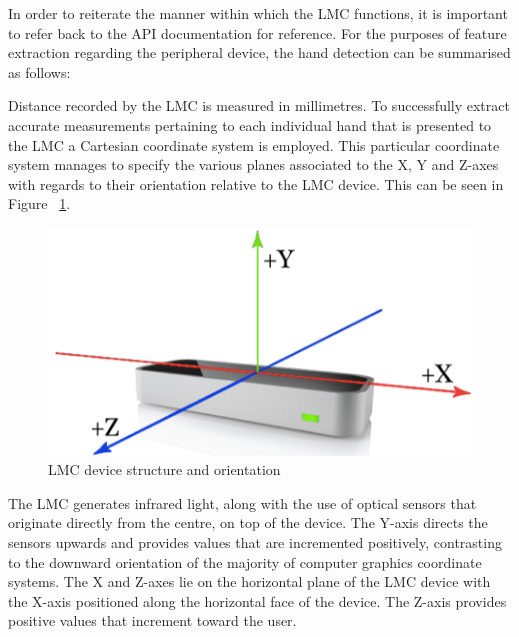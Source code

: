In order to reiterate the manner within which the LMC functions, it is important to refer back to the API documentation for reference. For the purposes of feature extraction regarding the peripheral device, the hand detection can be summarised as follows:

Distance recorded by the LMC is measured in millimetres. 
To successfully extract accurate measurements pertaining to each individual hand that is presented to the LMC a Cartesian coordinate system is employed. 	This particular coordinate system manages to specify the various planes associated to the X, Y and Z-axes with regards to their orientation relative to the LMC device. This can be seen in Figure ~\ref{fig:LMC device structure and orientation}. 

    
    \begin{figure}[htbp!] 
    \centering    
    \includegraphics[width=1.0\textwidth]{Chapter3/Figs/LMC_device_structure_and_orientation.png}
    \caption[LMC device structure and orientation]{LMC device structure and orientation}
    \label{fig:LMC device structure and orientation}
    \end{figure}


The LMC generates infrared light, along with the use of optical sensors that originate directly from the centre, on top of the device. The Y-axis directs the sensors upwards and provides values that are incremented positively, contrasting to the downward orientation of the majority of computer graphics coordinate systems. The X and Z-axes lie on the horizontal plane of the LMC device with the X-axis positioned along the horizontal face of the device. The Z-axis provides positive values that increment toward the user. 


